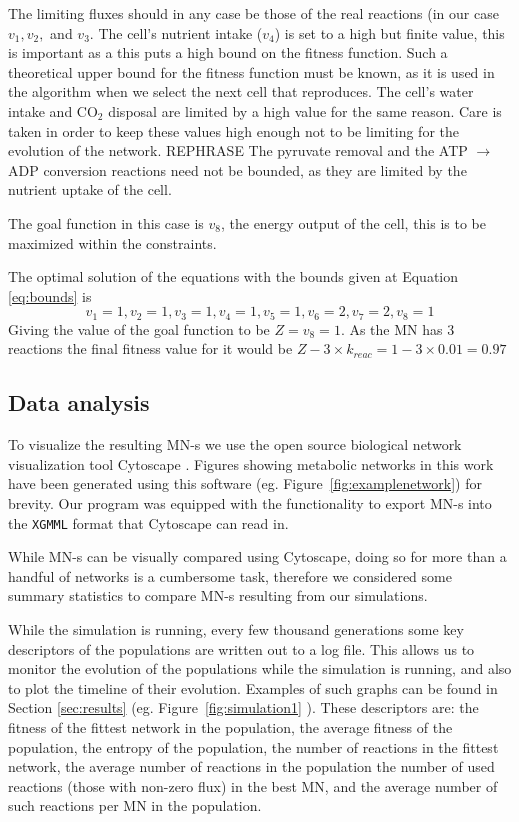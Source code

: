 \documentclass[a4paper,12pt]{article}
\begin{document}
	The limiting fluxes should in any case be those of the real reactions (in our case $v_1, v_2,$ and $v_3$. The cell's nutrient intake ($v_4$) is set to a high but finite value, this is important as a this puts a high bound on the fitness function. Such a theoretical upper bound for the fitness function must be known, as it is used in the algorithm when we select the next cell that reproduces. The cell's water intake and CO$_2$ disposal are limited by a high value for the same reason. Care is taken in order to keep these values high enough not to be limiting for the evolution of the network. REPHRASE The pyruvate removal and the ATP $\rightarrow$ ADP conversion reactions need not be bounded, as they are limited by the nutrient uptake of the cell. 

	The goal function in this case is $v_8$, the energy output of the cell, this is to be maximized within the constraints.

	The optimal solution of the equations with the bounds given at Equation \ref{eq:bounds} is 
	\begin{equation}\label{eq:solution}
		v_1=1 , v_2=1, v_3=1, v_4=1, v_5=1, v_6=2, v_7=2, v_8=1
	\end{equation}
	Giving the value of the goal function to be $Z=v_8=1$. As the MN has $3$ reactions the final fitness value for it would be $Z-3\times k_{reac}=1-3\times 0.01=0.97$
\subsection{Data analysis}
\label{sub:visualization}

To visualize the resulting MN-s we use the open source biological network visualization tool Cytoscape \cite{cytoscape}. Figures showing metabolic networks in this work have been generated using this software (eg.  Figure~\ref{fig:examplenetwork}) for brevity. Our program was equipped with the functionality to export MN-s into the \texttt{XGMML} format that Cytoscape can read in. 

While MN-s can be visually compared using Cytoscape, doing so for more than a handful of networks is a cumbersome task, therefore we considered some summary statistics to compare MN-s resulting from our simulations.

While the simulation is running, every few thousand generations some key descriptors of the populations are written out to a log file. This allows us to monitor the evolution of the populations while the simulation is running, and also to plot the timeline of their evolution. Examples of such graphs can be found in Section \ref{sec:results} (eg. Figure~\ref{fig:simulation1} ). These descriptors are: the fitness of the fittest network in the population, the average fitness of the population, the entropy of the population, the number of reactions in the fittest network, the average number of reactions in the population the number of used reactions (those with non-zero flux) in the best MN, and the average number of such reactions per MN in the population. 
\end{document}
